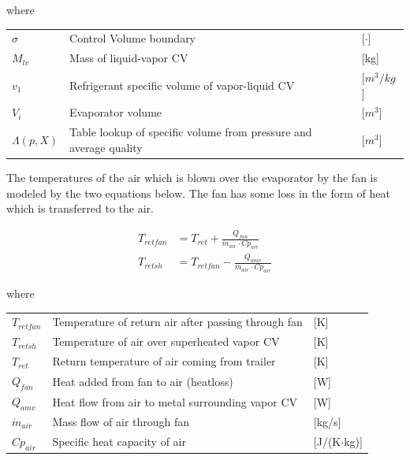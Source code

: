 where

\begin{center}
	\begin{tabular}{l p{10cm} l}
		$\sigma$   & Control Volume boundary                                           & [$\cdot$]            \\
		$M_{lv}$   & Mass of liquid-vapor CV                                           & [\si{kg}]            \\
		$v_1$      & Refrigerant specific volume of vapor-liquid CV                    & [$\si{m}^3/\si{kg}$] \\
		$V_i$      & Evaporator volume                                                 & [$\si{m}^3$]         \\
		$\Lambda(p,X)$ & Table lookup of specific volume from pressure and average quality & [$\si{m}^3$]
	\end{tabular}
\end{center}

\medskip
The temperatures of the air which is blown over the evaporator by the fan is modeled by the two equations below. The fan has some loss in the form of heat which is transferred to the air.

\begin{align}
	T_{retfan} 		& = T_{ret} + \frac{Q_{fan}}{\dot{m}_{air} \cdot Cp_{air}} 		\label{eq:T_retfan} 		\\
	T_{retsh} 		& = T_{retfan} - \frac{Q_{amv}}{\dot{m}_{air} \cdot Cp_{air}} 	\label{eq:T_retsh}
\end{align}

where

\begin{center}
	\begin{tabular}{l p{10cm} l}
		$T_{retfan}$    & Temperature of return air after passing through fan & [\si{K}]                          \\
		$T_{retsh}$     & Temperature of air over superheated vapor CV        & [\si{K}]                          \\
		$T_{ret}$       & Return temperature of air coming from trailer       & [\si{K}]                          \\
		$Q_{fan}$       & Heat added from fan to air (heatloss)               & [\si{W}]                          \\
		$Q_{amv}$       & Heat flow from air to metal surrounding vapor CV    & [\si{W}]                          \\
		$\dot{m}_{air}$ & Mass flow of air through fan                        & [\si{kg}/\si{s}]                  \\
		$Cp_{air}$      & Specific heat capacity of air                       & [\si{J}/(\si{K}$ \cdot $\si{kg})]
	\end{tabular}
\end{center}

